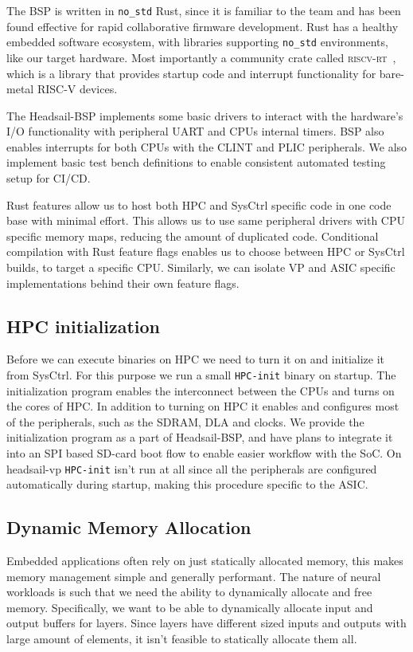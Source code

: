 \documentclass[12pt,a4paper,english
]{tunithesis}
\begin{document}
The BSP is written in \texttt{no\_std} Rust, since it is familiar to the team and has been found effective for rapid collaborative firmware development. Rust has a healthy embedded software ecosystem, with libraries supporting \texttt{no\_std} environments, like our target hardware. Most importantly a community crate called \textsc{riscv-rt}~\cite{riscv_rt}, which is a library that provides startup code and interrupt functionality for bare-metal RISC-V devices.

The Headsail-BSP implements some basic drivers to interact with the hardware's I/O functionality with peripheral UART and CPUs internal timers. BSP also enables interrupts for both CPUs with the CLINT and PLIC peripherals. We also implement basic test bench definitions to enable consistent automated testing setup for CI/CD.

Rust features allow us to host both HPC and SysCtrl specific code in one code base with minimal effort. This allows us to use same peripheral drivers with CPU specific memory maps, reducing the amount of duplicated code. Conditional compilation with Rust feature flags enables us to choose between HPC or SysCtrl builds, to target a specific CPU. Similarly, we can isolate VP and ASIC specific implementations behind their own feature flags.

\subsection{HPC initialization}
Before we can execute binaries on HPC we need to turn it on and initialize it from SysCtrl. For this purpose we run a small \texttt{HPC-init} binary on startup. The initialization program enables the interconnect between the CPUs and turns on the cores of HPC. In addition to turning on HPC it enables and configures most of the peripherals, such as the SDRAM, DLA and clocks.
We provide the initialization program as a part of Headsail-BSP, and have plans to integrate it into an SPI based SD-card boot flow to enable easier workflow with the SoC.
On headsail-vp \texttt{HPC-init} isn't run at all since all the peripherals are configured automatically during startup, making this procedure specific to the ASIC.

\subsection{Dynamic Memory Allocation}
Embedded applications often rely on just statically allocated memory, this makes memory management simple and generally performant. The nature of neural workloads is such that we need the ability to dynamically allocate and free memory. Specifically, we want to be able to dynamically allocate input and output buffers for layers. Since layers have different sized inputs and outputs with large amount of elements, it isn't feasible to statically allocate them all.
\end{document}
